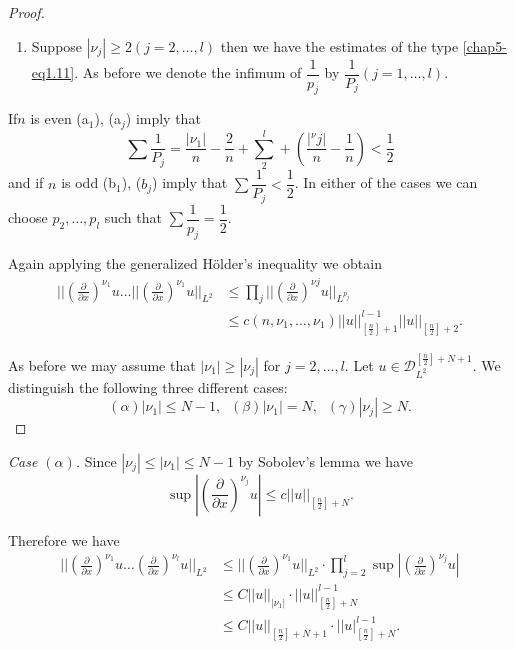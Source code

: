 \begin{proof}
\begin{enumerate}[\rm(i)]
\item Suppose $|\nu_j | \geq 2 (j = 2, \ldots, l)$ then we have the
  estimates of the type \eqref{chap5-eq1.11}. As before we denote the
  infimum of  $\dfrac{1}{p_j}$ by $\dfrac{1}{P_j}(j =1, \ldots, l)$. 
\end{enumerate}

If\pageoriginale $n$ is even (a$_1$), (a$_j$) imply that
$$
\sum \frac{1}{P_j} = \frac{|\nu_1|}{n} - \frac{2}{n} + \sum\limits^l_2 +
\left(\frac{|{}^\nu j|}{n}- \frac{1}{n}\right) < \frac{1}{2} 
$$
and if $n$ is odd (b$_1$), ($b_j$) imply that $\sum \dfrac{1}{P_j} <
\dfrac{1}{2}$. In either of the cases we can choose $p_2, \ldots, p_l$
such that $\sum \dfrac{1}{p_j}= \dfrac{1}{2}$. 

Again applying the generalized H\"older's inequality we obtain
\begin{align*}
|| \left(\frac{\partial}{\partial x}\right)^{\nu_1} u \ldots ||
\left(\frac{\partial}{\partial x}\right)^{\nu_1} u ||_{L^2} & \leq \prod\limits_j
||\left(\frac{\partial}{\partial x}\right)^{\nu j} u ||_{L^{p_j}} \\ 
&  \leq c(n, \nu_1, \ldots, \nu_1 ) || u ||^{l-1}_{\left[\frac{n}{2}
    \right]+1}|| u ||_{\left[\frac{n}{2}\right]+2}.  
\end{align*}

\item As before we may assume that $|\nu_1|\geq|\nu_j|$ for
$j=2, \ldots, l$. Let $u \in
\mathscr{D}^{\left[\frac{n}{2} \right]+N+1}_{L^2}$. We distinguish
the following three different cases:  
$$
(\alpha) | \nu_1 | \leq N-1, \;\; (\beta) | \nu_1| = N, \;\; (\gamma)
| \nu_j | \geq N.  
$$
\end{proof}

\noindent
\textit{Case $(\alpha)$.} Since $|\nu_j | \leq | \nu_1 | \leq N-1$ by
Sobolev's lemma we have 
$$
\sup |\left( \frac{\partial}{\partial x}\right)^{\nu_j} u | \leq c || u
||_{\left[\frac{n}{2} \right]+N}. 
$$

Therefore we have
\begin{align*}
|| \left(\frac{\partial}{\partial x}\right)^{\nu_1} u \ldots
\left(\frac{\partial}{\partial x}\right)^{\nu_l} u ||_{L^2} & \leq ||
\left(\frac{\partial}{\partial x}\right)^{\nu_1} u ||_{L^2} \cdot
\prod\limits^l_{j=2} \sup | 
\left(\frac{\partial}{\partial x}\right)^{\nu_j}u| \\ 
& \leq C || u ||_{| \nu_1 |} \cdot || u
||^{l-1}_{\left[\frac{n}{2}\right]+N} \\  
& \leq C || u ||_{\left[\frac{n}{2} \right]+N+1} \cdot || u
|^{l-1}_{\left[\frac{n}{2} \right]+N} . 
\end{align*}

